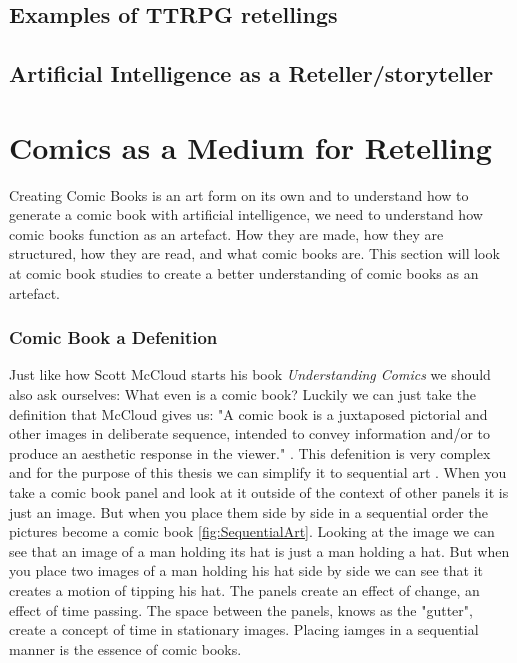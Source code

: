 
\subsection{Examples of TTRPG retellings}

\subsection{Artificial Intelligence as a Reteller/storyteller}

\section{Comics as a Medium for Retelling}
Creating Comic Books is an art form on its own and to understand how to generate a comic book with artificial intelligence, we need to understand how comic books function as an artefact. How they are made, how they are structured, how they are read, and what comic books are. This section will look at comic book studies to create a better understanding of comic books as an artefact.

\subsubsection{Comic Book a Defenition}
Just like how Scott McCloud starts his book \textit{Understanding Comics} we should also ask ourselves: What even is a comic book? Luckily we can just take the definition that McCloud gives us: "A comic book is a juxtaposed pictorial and other images in deliberate sequence, intended to convey information and/or to produce an aesthetic response in the viewer." \cite{mccloud1993understanding}. This defenition is very complex and for the purpose of this thesis we can simplify it to sequential art \cite{eisner2008comics}. When you take a comic book panel and look at it outside of the context of other panels it is just an image. But when you place them side by side in a sequential order the pictures become a comic book \ref{fig:SequentialArt}. Looking at the image we can see that an image of a man holding its hat is just a man holding a hat. But when you place two images of a man holding his hat side by side we can see that it creates a motion of tipping his hat. The panels create an effect of change, an effect of time passing. The space between the panels, knows as the "gutter", create a concept of time in stationary images. Placing iamges in a sequential manner is the essence of comic books.

